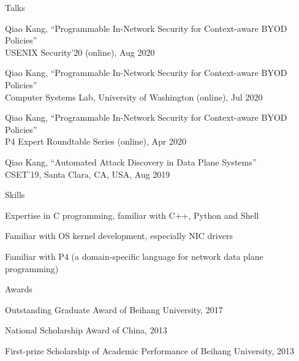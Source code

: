 \documentclass{resume} %
\begin{document}
\begin{rSection}{Talks}

\item Qiao Kang, ``Programmable In-Network Security for Context-aware BYOD Policies'' \\
USENIX Security'20 (online), Aug 2020

\item Qiao Kang, ``Programmable In-Network Security for Context-aware BYOD Policies'' \\
Computer Systems Lab, University of Washington (online), Jul 2020

\item Qiao Kang, ``Programmable In-Network Security for Context-aware BYOD Policies'' \\
P4 Expert Roundtable Series (online), Apr 2020

\item Qiao Kang, ``Automated Attack Discovery in Data Plane Systems'' \\
CSET'19, Santa Clara, CA, USA, Aug 2019

\end{rSection}




\begin{rSection}{Skills} \itemsep -3pt

\item Expertise in C programming, familiar with C++, Python and Shell
\item Familiar with OS kernel development, especially NIC drivers
\item Familiar with P4 (a domain-specific language for network data plane programming)

\end{rSection}


\begin{rSection}{Awards} \itemsep -3pt
\item Outstanding Graduate Award of Beihang University, 2017
\item National Scholarship Award of China, 2013
\item First-prize Scholarship of Academic Performance of Beihang University, 2013

\end{rSection}
\end{document}
